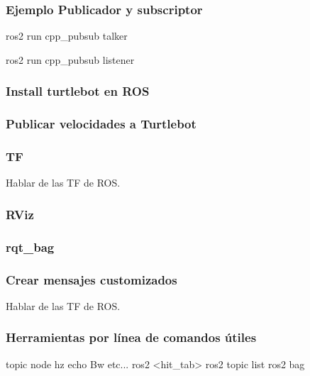 \begin{frame}
	\frametitle{Ejemplo Publicador y subscriptor}
	
	
	ros2 run cpp\_pubsub talker
	
	ros2 run cpp\_pubsub listener
	
\end{frame}


\begin{frame}
	\frametitle{Install turtlebot en ROS}
	
\end{frame}

\begin{frame}
	\frametitle{Publicar velocidades a Turtlebot}
	
\end{frame}

\begin{frame}
	\frametitle{TF}
	Hablar de las TF de ROS.
	
\end{frame}

\begin{frame}
	\frametitle{RViz}

	
\end{frame}

\begin{frame}
    \frametitle{rqt\_bag}

    
\end{frame}

\begin{frame}
	\frametitle{Crear mensajes customizados}
	Hablar de las TF de ROS.
	
\end{frame}

\begin{frame}
	\frametitle{Herramientas por línea de comandos útiles}
    topic node hz echo Bw etc...
    ros2 <hit\_tab>
    ros2 topic list
    ros2 bag 
	
\end{frame}

